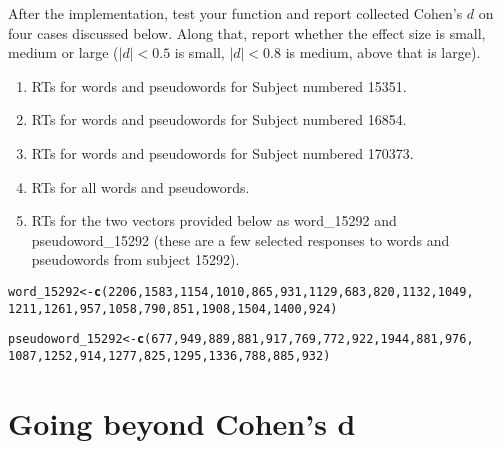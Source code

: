 \documentclass{article}\usepackage[]{graphicx}\usepackage[]{color}
\makeatletter
\newcommand{\hlnum}[1]{\textcolor[rgb]{0.686,0.059,0.569}{#1}}%
\newcommand{\hlstd}[1]{\textcolor[rgb]{0.345,0.345,0.345}{#1}}%
\newcommand{\hlkwb}[1]{\textcolor[rgb]{0.69,0.353,0.396}{#1}}%
\newcommand{\hlkwd}[1]{\textcolor[rgb]{0.737,0.353,0.396}{\textbf{#1}}}%
\newenvironment{kframe}{%
 \def\at@end@of@kframe{}%
 \ifinner\ifhmode%
  \def\at@end@of@kframe{\end{minipage}}%
  \begin{minipage}{\columnwidth}%
 \fi\fi%
 \def\FrameCommand##1{\hskip\@totalleftmargin \hskip-\fboxsep
 \colorbox{shadecolor}{##1}\hskip-\fboxsep
     \hskip-\linewidth \hskip-\@totalleftmargin \hskip\columnwidth}%
 \MakeFramed {\advance\hsize-\width
   \@totalleftmargin\z@ \linewidth\hsize
   \@setminipage}}%
 {\par\unskip\endMakeFramed%
 \at@end@of@kframe}
\newenvironment{knitrout}{}{} %
\makeatother
\begin{document}
After the implementation, test your function and report collected Cohen's $d$ on four cases discussed below. Along that, report whether the effect size is small, medium or large ($|d|<0.5$ is small, $|d|<0.8$ is medium, above that is large).
\begin{enumerate}
    \item RTs for words and pseudowords for Subject numbered 15351.
    \item RTs for words and pseudowords for Subject numbered 16854.
    \item RTs for words and pseudowords for Subject numbered 170373.
    \item RTs for all words and pseudowords.
    \item RTs for the two vectors provided below as word\_15292 and pseudoword\_15292 (these are a few selected responses to words and pseudowords from subject 15292).
\end{enumerate}

\begin{knitrout}
\color{fgcolor}\begin{kframe}
\begin{alltt}
\hlstd{word_15292} \hlkwb{<-} \hlkwd{c}\hlstd{(}\hlnum{2206}\hlstd{,} \hlnum{1583}\hlstd{,} \hlnum{1154}\hlstd{,} \hlnum{1010}\hlstd{,} \hlnum{865}\hlstd{,} \hlnum{931}\hlstd{,} \hlnum{1129}\hlstd{,} \hlnum{683}\hlstd{,} \hlnum{820}\hlstd{,} \hlnum{1132}\hlstd{,} \hlnum{1049}\hlstd{,}
    \hlnum{1211}\hlstd{,} \hlnum{1261}\hlstd{,} \hlnum{957}\hlstd{,} \hlnum{1058}\hlstd{,} \hlnum{790}\hlstd{,} \hlnum{851}\hlstd{,} \hlnum{1908}\hlstd{,} \hlnum{1504}\hlstd{,} \hlnum{1400}\hlstd{,} \hlnum{924}\hlstd{)}

\hlstd{pseudoword_15292} \hlkwb{<-} \hlkwd{c}\hlstd{(}\hlnum{677}\hlstd{,} \hlnum{949}\hlstd{,} \hlnum{889}\hlstd{,} \hlnum{881}\hlstd{,} \hlnum{917}\hlstd{,} \hlnum{769}\hlstd{,} \hlnum{772}\hlstd{,} \hlnum{922}\hlstd{,} \hlnum{1944}\hlstd{,} \hlnum{881}\hlstd{,} \hlnum{976}\hlstd{,}
    \hlnum{1087}\hlstd{,} \hlnum{1252}\hlstd{,} \hlnum{914}\hlstd{,} \hlnum{1277}\hlstd{,} \hlnum{825}\hlstd{,} \hlnum{1295}\hlstd{,} \hlnum{1336}\hlstd{,} \hlnum{788}\hlstd{,} \hlnum{885}\hlstd{,} \hlnum{932}\hlstd{)}
\end{alltt}
\end{kframe}
\end{knitrout}


\section{Going beyond Cohen's d}
\end{document}
